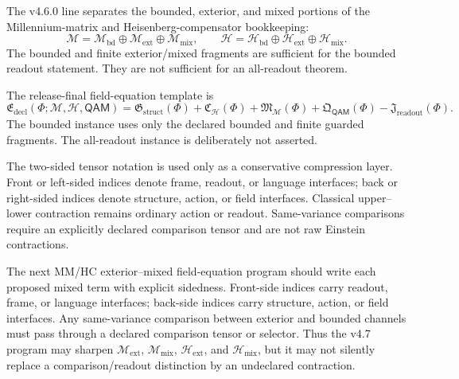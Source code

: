 \begin{remark}
The v4.6.0 line separates the bounded, exterior, and mixed portions of the
Millennium-matrix and Heisenberg-compensator bookkeeping:
\[
\mathcal M=\mathcal M_{\mathrm{bd}}\oplus\mathcal M_{\mathrm{ext}}\oplus\mathcal M_{\mathrm{mix}},
\qquad
\mathcal H=\mathcal H_{\mathrm{bd}}\oplus\mathcal H_{\mathrm{ext}}\oplus\mathcal H_{\mathrm{mix}}.
\]
The bounded and finite exterior/mixed fragments are sufficient for the bounded
readout statement.  They are not sufficient for an all-readout theorem.
\end{remark}

\begin{definition}
The release-final field-equation template is
\[
\mathfrak E_{\mathrm{decl}}(\Phi;\mathcal M,\mathcal H,\mathsf{QAM})
=
\mathfrak G_{\mathrm{struct}}(\Phi)
+
\mathfrak C_{\mathcal H}(\Phi)
+
\mathfrak M_{\mathcal M}(\Phi)
+
\mathfrak Q_{\mathsf{QAM}}(\Phi)
-
\mathfrak J_{\mathrm{readout}}(\Phi).
\]
The bounded instance uses only the declared bounded and finite guarded fragments.
The all-readout instance is deliberately not asserted.
\end{definition}

\begin{remark}
The two-sided tensor notation is used only as a conservative compression layer.
Front or left-sided indices denote frame, readout, or language interfaces; back
or right-sided indices denote structure, action, or field interfaces.  Classical
upper--lower contraction remains ordinary action or readout.  Same-variance
comparisons require an explicitly declared comparison tensor and are not raw
Einstein contractions.
\end{remark}

\begin{remark}
The next MM/HC exterior--mixed field-equation program should write each proposed
mixed term with explicit sidedness.  Front-side indices carry readout, frame, or
language interfaces; back-side indices carry structure, action, or field
interfaces.  Any same-variance comparison between exterior and bounded channels
must pass through a declared comparison tensor or selector.  Thus the v4.7
program may sharpen \(\mathcal M_{\mathrm{ext}}\), \(\mathcal M_{\mathrm{mix}}\),
\(\mathcal H_{\mathrm{ext}}\), and \(\mathcal H_{\mathrm{mix}}\), but it may not
silently replace a comparison/readout distinction by an undeclared contraction.
\end{remark}

